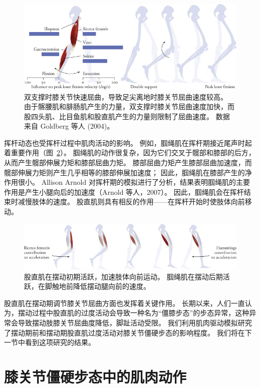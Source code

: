 \begin{figure}[!htb]
	\centering
	\includegraphics[width=1.0\linewidth]{chap11/11_4}
	\caption{双支撑时膝关节快速屈曲，导致足尖离地时膝关节屈曲速度较高。
		由于髂腰肌和腓肠肌产生的力量，双支撑时膝关节屈曲速度加快，而股四头肌、比目鱼肌和股直肌产生的力量则限制了屈曲速度。
		数据来自 Goldberg 等人 (2004)。 \label{fig:11_4}}
\end{figure}


挥杆动态也受挥杆过程中肌肉活动的影响。
例如，腘绳肌在挥杆期接近尾声时起着重要作用（图~\ref{fig:11_5}）。
腘绳肌的动作很复杂，因为它们交叉于髋部和膝部的后方，从而产生髋部伸展力矩和膝部屈曲力矩。
膝部屈曲力矩产生膝部屈曲加速度，而髋部伸展力矩则产生几乎相等的膝部伸展加速度；
因此，腘绳肌在膝部产生的净作用很小。
Allison Arnold 对挥杆期的模拟进行了分析，结果表明腘绳肌的主要作用是产生小腿向后的加速度（Arnold 等人，2007）。
因此，腘绳肌会在挥杆结束时减慢肢体的速度。
股直肌则具有相反的作用——在挥杆开始时使肢体向前移动。


\begin{figure}[!htb]
	\centering
	\includegraphics[width=1.0\linewidth]{chap11/11_5}
	\caption{股直肌在摆动初期活跃，加速肢体向前运动。
		腘绳肌在摆动后期活跃，在脚触地前降低摆动腿向前的速度。 \label{fig:11_5}}
\end{figure}


股直肌在摆动期调节膝关节屈曲方面也发挥着关键作用。
长期以来，人们一直认为，摆动过程中股直肌的过度活动会导致一种名为“僵膝步态”的步态异常，这种异常会导致摆动肢膝关节屈曲度降低，脚趾活动受限。
我们利用肌肉驱动模拟研究了摆动期前和摆动期股直肌过度活动对膝关节僵硬步态的影响程度。
我们将在下一节中看到这项研究的结果。


\section{膝关节僵硬步态中的肌肉动作}

